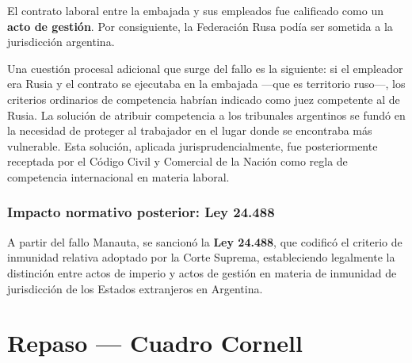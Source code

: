 \documentclass[12pt,oneside]{book}
\begin{document}
El contrato laboral entre la embajada y sus empleados fue calificado como un \textbf{acto de gestión}. Por consiguiente, la Federación Rusa podía ser sometida a la jurisdicción argentina.

\begin{note}
Una cuestión procesal adicional que surge del fallo es la siguiente: si el empleador era Rusia y el contrato se ejecutaba en la embajada —que es territorio ruso—, los criterios ordinarios de competencia habrían indicado como juez competente al de Rusia. La solución de atribuir competencia a los tribunales argentinos se fundó en la necesidad de proteger al trabajador en el lugar donde se encontraba más vulnerable. Esta solución, aplicada jurisprudencialmente, fue posteriormente receptada por el Código Civil y Comercial de la Nación como regla de competencia internacional en materia laboral.
\end{note}

\subsection{Impacto normativo posterior: Ley 24.488}


A partir del fallo Manauta, se sancionó la \textbf{Ley 24.488}, que codificó el criterio de inmunidad relativa adoptado por la Corte Suprema, estableciendo legalmente la distinción entre actos de imperio y actos de gestión en materia de inmunidad de jurisdicción de los Estados extranjeros en Argentina.

\chapter{Repaso --- Cuadro Cornell}
\end{document}
